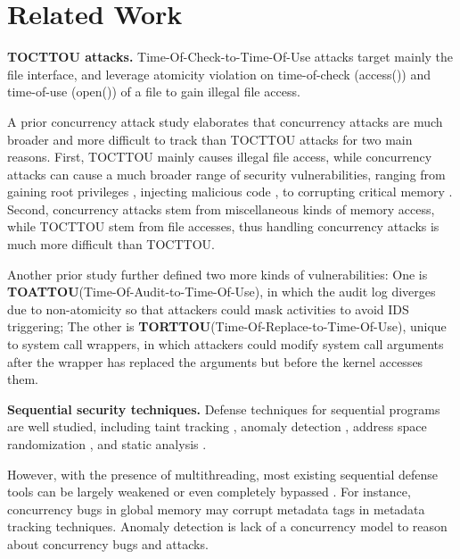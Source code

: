 \section{Related Work} \label{sec:related}


\textbf{TOCTTOU attacks.} Time-Of-Check-to-Time-Of-Use attacks \cite{bishop1996checking,tsyrklevich2003dynamic, tsafrir2008portably,wei2005tocttou}
target mainly the file interface, and
leverage atomicity violation on time-of-check (access())
and time-of-use (open()) of a file to gain illegal file access. 

A prior concurrency attack study \cite{yang2016concurrency} elaborates that concurrency
attacks are much broader and more difficult to track
than TOCTTOU attacks for two main reasons. First, TOCTTOU
mainly causes illegal file access, while concurrency attacks
can cause a much broader range of security vulnerabilities,
ranging from gaining root privileges \cite{uselib-bug-12791} , injecting malicious
code \cite{freebsdcve}, to corrupting critical memory \cite{apache-bug-25520}. Second, concurrency
attacks stem from miscellaneous kinds of memory access, while
TOCTTOU stem from file accesses, thus handling concurrency
attacks is much more difficult than TOCTTOU.

Another prior study \cite{concurrency:woot07} further
defined two more kinds of vulnerabilities: One is \textbf{TOATTOU}(Time-Of-Audit-to-Time-Of-Use),
in which the audit log diverges due to non-atomicity so that attackers could mask activities to avoid IDS triggering; 
The other is \textbf{TORTTOU}(Time-Of-Replace-to-Time-Of-Use), unique to system call wrappers, in which attackers could 
modify system call arguments after the wrapper has replaced the arguments but before the kernel accesses them.

\noindent
\textbf{Sequential security techniques.} Defense techniques for sequential
programs are well studied, including taint tracking \cite{taintdroid:osdi10,lift:micro06,sospinfomationflowcontrol,valgrind:pldi}, 
anomaly detection \cite{taskrecycling:ppopp90,schonberg:pldi89}, address space
randomization \cite{aslr-fail:ccs04}, and static analysis \cite{seth:pldi,engler:vmcai,wagner:intrusion,coverity:cacm,klee:osdi08}.

However, with the presence of multithreading, most existing
sequential defense tools can be largely weakened or even
completely bypassed \cite{con-tr}. For instance, concurrency bugs
in global memory may corrupt metadata tags in metadata
tracking techniques. Anomaly detection is lack of a concurrency
model to reason about concurrency bugs and attacks.

